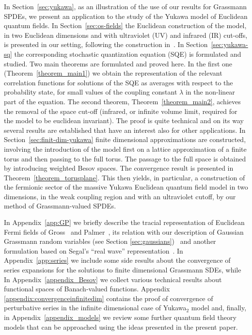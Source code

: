 \documentclass{article}
\begin{document}
In Section~\ref{sec:yukawa}, as an illustration of the use of our results for
Grassmann SPDEs, we present an application to the study of the Yukawa model of
Euclidean quantum fields. In Section~\ref{sec:os-fields} the Euclidean
construction of the model, in two Euclidean dimensions and with ultraviolet
(UV) and infrared (IR) cut-offs, is presented in our setting, following the
construction in~{\cite{osterwalder_euclidean_1973-2}}. In
Section~\ref{sec:yukawa-sq} the corresponding stochastic quantization equation
(SQE) is formulated and studied. Two main theorems are formulated and proved
here. In the first one (Theorem~\ref{theorem_main1}) we obtain the
representation of the relevant correlation functions for solutions of the SQE
as averages with respect to the probability state, for small values of the
coupling constant $\lambda$ in the non-linear part of the equation. The second
theorem, Theorem~\ref{theorem_main2}, achieves the removal of the space
cut-off (infrared, or infinite volume limit, required for the model to be
euclidean invariant). The proof is quite technical and on its way several
results are established that have an interest also for other applications. In
Section~\ref{sec:finit-dim-yukawa} finite dimensional approximations are
constructed, involving the introduction of the model first on a lattice
approximation of a finite torus and then passing to the full torus. The
passage to the full space is obtained by introducing weighted Besov spaces.
The convergence result is presented in Theorem~\ref{theorem_torusplane}. This
then yields, in particular, a construction of the fermionic sector of the
massive Yukawa Euclidean quantum field model in two dimensions, in the weak
coupling region and with an ultraviolet cutoff, by our method of
Grassmann-valued SPDEs.

In Appendix~\ref{app:GP} we briefly describe the tracial representation of
Euclidean Fermi fields of Gross~{\cite{Gross_Euclidean_1976}} and
Palmer~{\cite{palmer_euclidean_1980}}, its relation with our description of
Gaussian Grassmann random variables (see Section \ref{sec:gaussians}) \ and
another formulation based on Segal's ``real wave''
representation~{\cite{Segalbook}}. In Appendix~\ref{app:series} we include
some side results about the convergence of series expansions for the solutions
to finite dimensional Grassmann SDEs, while In Appendix~\ref{appendix_Besov}
we collect various technical results about functional spaces of Banach-valued
functions. Appendix \ref{appendix:convergenceinfinitedim} contains the proof
of convergence of perturbative series in the infinite dimensional case of
Yukawa$_2$ model and, finally, in Appendix~\ref{appendix_models} we review
some further quantum field theory models that can be approached using the
ideas presented in the present paper.
\end{document}
